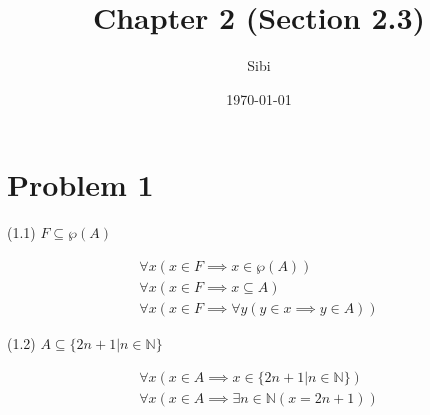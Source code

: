 \documentclass{article}
\begin{document}
\title{Chapter 2 (Section 2.3)}
\author{Sibi}
\date{\today}
\maketitle
\newpage

\section{Problem 1}

\begin{center}
(1.1) $F \subseteq \wp(A)$
\end{center}  
\begin{align*}
\forall x (x \in F \implies x \in \wp(A)) \\
\forall x (x \in F \implies x \subseteq A) \\
\forall x (x \in F \implies \forall y (y \in x \implies y \in A)) 
\end{align*}

\begin{center}
(1.2) $A \subseteq \{2n + 1 | n \in \mathbb{N}\}$ \\
\end{center}
\begin{align*}
\forall x (x \in A \implies x \in \{2n + 1 | n \in \mathbb{N}\}) \\
\forall x (x \in A \implies \exists n \in \mathbb{N} (x=2n+1))
\end{align*}
\end{document}
